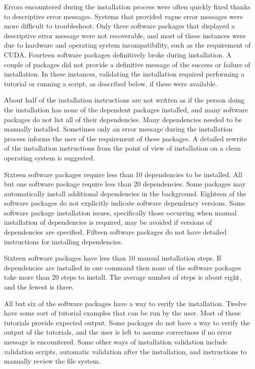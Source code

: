 \documentclass[12pt, notitlepage]{article}
\begin{document}
Errors encountered during the installation process were often quickly fixed thanks to descriptive error messages. Systems that provided vague error messages were more difficult to troubleshoot. Only three software packages that displayed a descriptive error message were not recoverable, and most of these instances were due to hardware and operating system incompatibility, such as the requirement of CUDA. Fourteen software packages definitively broke during installation. A couple of packages did not provide a definitive message of the success or failure of installation. In these instances, validating the installation required performing a tutorial or running a script, as described below, if these were available. 

About half of the installation instructions are not written as if the person doing the installation has none of the dependent packages installed, and many software packages do not list all of their dependencies. Many dependencies needed to be manually installed. Sometimes only an error message during the installation process informs the user of the requirement of these packages. A detailed rewrite of the installation instructions from the point of view of installation on a clean operating system is suggested.

Sixteen software packages require less than 10 dependencies to be installed. All but one software package require less than 20 dependencies. Some packages may automatically install additional dependencies in the background. Eighteen of the software packages do not explicitly indicate software dependency versions. Some software package installation issues, specifically those occurring when manual installation of dependencies is required, may be avoided if versions of dependencies are specified. Fifteen software packages do not have detailed instructions for installing dependencies. 

Sixteen software packages have less than 10 manual installation steps. If dependencies are installed in one command then none of the software packages take more than 20 steps to install. The average number of steps is about eight, and the fewest is three. 

All but six of the software packages have a way to verify the installation. Twelve have some sort of tutorial examples that can be run by the user. Most of these tutorials provide expected output. Some packages do not have a way to verify the output of the tutorials, and the user is left to assume correctness if no error message is encountered. Some other ways of installation validation include validation scripts, automatic validation after the installation, and instructions to manually review the file system. 
\end{document}
